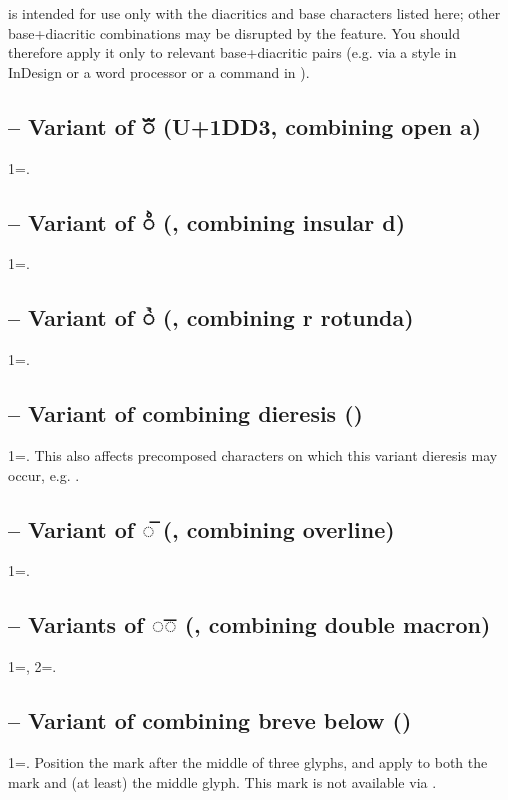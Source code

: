 \noindent{} is intended for use only with the diacritics and base characters listed here; other
base+diacritic combinations may be disrupted by the feature. You should therefore apply it only to
relevant base+diacritic pairs (e.g. via a style in InDesign or a word processor or a command in
{\LuaTeX}).



\subsection{ – Variant of ◌ᷓ (U+1DD3, combining open a)}
1=.

\subsection{ – Variant of ◌ᷘ (, combining insular
d)}
1=.

\subsection{ – Variant of ◌ᷣ (, combining r rotunda)}
1=.

\subsection{ – Variant of combining dieresis ()}
1=. This also affects precomposed characters on which this variant dieresis may occur, e.g.
.

\subsection{ – Variant of ◌̅ (,
combining overline)}
1=.

\subsection{ – Variants of ◌͞◌ (, combining double macron)}
1=, 2=.

\subsection{ – Variant of combining breve below ()}
1=. Position the mark after the middle of three glyphs, and apply 
to both the mark and (at least) the middle glyph. This mark is not available via .

